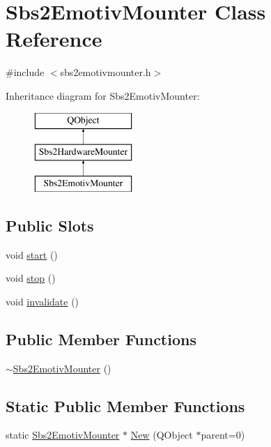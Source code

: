 \hypertarget{classSbs2EmotivMounter}{\section{Sbs2\-Emotiv\-Mounter Class Reference}
\label{classSbs2EmotivMounter}
}


{\ttfamily \#include $<$sbs2emotivmounter.\-h$>$}

Inheritance diagram for Sbs2\-Emotiv\-Mounter\-:\begin{figure}[H]
\begin{center}
\leavevmode
\includegraphics[height=3.000000cm]{classSbs2EmotivMounter}
\end{center}
\end{figure}
\subsection*{Public Slots}
\begin{DoxyCompactItemize}
\item 
void \hyperlink{classSbs2EmotivMounter_a2888e172fdb5428ae4c620be9b6686c4}{start} ()
\item 
void \hyperlink{classSbs2EmotivMounter_a4e0000fb5e7f3eed5dd6e9c9e7b35217}{stop} ()
\item 
void \hyperlink{classSbs2EmotivMounter_af730039b8d644ca1af6661b2ba7bb240}{invalidate} ()
\end{DoxyCompactItemize}
\subsection*{Public Member Functions}
\begin{DoxyCompactItemize}
\item 
\hyperlink{classSbs2EmotivMounter_a1a1e666cc3e7fb3229400fa98ebc831e}{$\sim$\-Sbs2\-Emotiv\-Mounter} ()
\end{DoxyCompactItemize}
\subsection*{Static Public Member Functions}
\begin{DoxyCompactItemize}
\item 
static \hyperlink{classSbs2EmotivMounter}{Sbs2\-Emotiv\-Mounter} $\ast$ \hyperlink{classSbs2EmotivMounter_a9326cef45222dc1fdb5064e4460f9ceb}{New} (Q\-Object $\ast$parent=0)
\end{DoxyCompactItemize}
